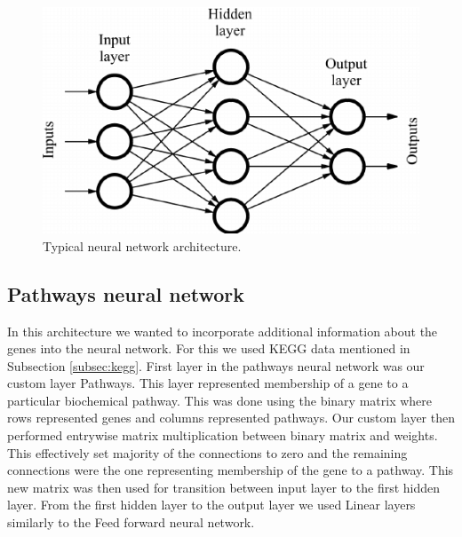 \begin{figure}
    \centering
    \includegraphics[width=\linewidth]{images/ff_nn.png}
    \caption{Typical neural network architecture.}
    \label{fig:ff_nn}
\end{figure}

\subsection{Pathways neural network}
In this architecture we wanted to incorporate additional information about the genes into the neural network.
For this we used KEGG data mentioned in Subsection \ref{subsec:kegg}.
First layer in the pathways neural network was our custom layer Pathways.
This layer represented membership of a gene to a particular biochemical pathway.
This was done using the binary matrix where rows represented genes and columns represented pathways.
Our custom layer then performed entrywise matrix multiplication between binary matrix and weights.
This effectively set majority of the connections to zero and the remaining connections were the one representing membership of the gene to a pathway.
This new matrix was then used for transition between input layer to the first hidden layer.
From the first hidden layer to the output layer we used Linear layers similarly to the Feed forward neural network.

